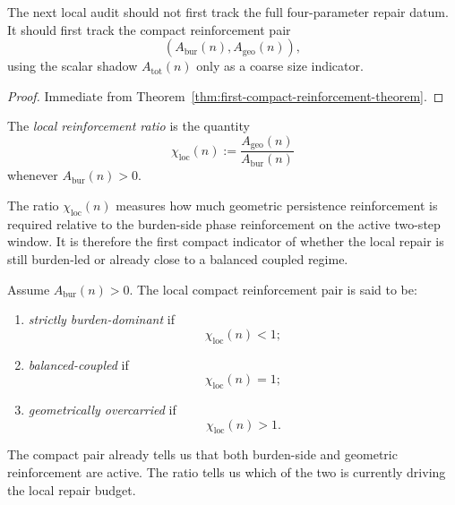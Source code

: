 \begin{corollary}
\label{cor:current-compact-reinforcement-working-rule}
The next local audit should not first track the full four-parameter repair datum.
It should first track the compact reinforcement pair
\[
 (A_{\mathrm{bur}}(n),A_{\mathrm{geo}}(n)),
\]
using the scalar shadow $A_{\mathrm{tot}}(n)$ only as a coarse size indicator.
\end{corollary}

\begin{proof}
Immediate from Theorem~\ref{thm:first-compact-reinforcement-theorem}.
\end{proof}


\begin{definition}
\label{def:local-reinforcement-ratio}
The \emph{local reinforcement ratio} is the quantity
\[
 \chi_{\mathrm{loc}}(n)
 :=
 \frac{A_{\mathrm{geo}}(n)}{A_{\mathrm{bur}}(n)}
\]
whenever $A_{\mathrm{bur}}(n)>0$.
\end{definition}

\begin{remark}
\label{rem:meaning-of-the-local-reinforcement-ratio}
The ratio $\chi_{\mathrm{loc}}(n)$ measures how much geometric persistence reinforcement is required relative to the burden-side phase reinforcement on the active two-step window.
It is therefore the first compact indicator of whether the local repair is still burden-led or already close to a balanced coupled regime.
\end{remark}

\begin{definition}
\label{def:local-reinforcement-regime-classes}
Assume $A_{\mathrm{bur}}(n)>0$.
The local compact reinforcement pair is said to be:
\begin{enumerate}[leftmargin=2em,label=(\alph*)]
 \item \emph{strictly burden-dominant} if
 \[
 \chi_{\mathrm{loc}}(n)<1;
 \]
 \item \emph{balanced-coupled} if
 \[
 \chi_{\mathrm{loc}}(n)=1;
 \]
 \item \emph{geometrically overcarried} if
 \[
 \chi_{\mathrm{loc}}(n)>1.
 \]
\end{enumerate}
\end{definition}

\begin{remark}
\label{rem:why-the-ratio-matters}
The compact pair already tells us that both burden-side and geometric reinforcement are active.
The ratio tells us which of the two is currently driving the local repair budget.
\end{remark}

